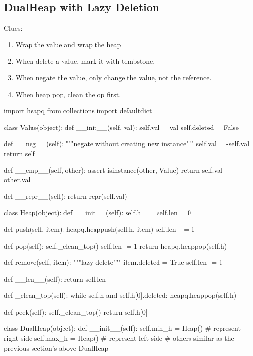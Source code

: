 \subsection{DualHeap with Lazy Deletion}\label{dh_lazy_del}
Clues:
\begin{enumerate}
\item Wrap the value and wrap the heap
\item When delete a value, mark it with tombstone. 
\item When negate the value, only change the value, not the reference. 
\item When heap pop, clean the op first. 
\end{enumerate}
\begin{python}
import heapq
from collections import defaultdict


class Value(object):
    def __init__(self, val):
        self.val = val
        self.deleted = False

    def __neg__(self):
        """negate without creating new instance"""
        self.val = -self.val
        return self

    def __cmp__(self, other):
        assert isinstance(other, Value)
        return self.val - other.val

    def __repr__(self):
        return repr(self.val)


class Heap(object):
    def __init__(self):
        self.h = []
        self.len = 0

    def push(self, item):
        heapq.heappush(self.h, item)
        self.len += 1

    def pop(self):
        self._clean_top()
        self.len -= 1
        return heapq.heappop(self.h)

    def remove(self, item):
        """lazy delete"""
        item.deleted = True
        self.len -= 1

    def __len__(self):
        return self.len

    def _clean_top(self):
        while self.h and self.h[0].deleted:
            heapq.heappop(self.h)

    def peek(self):
        self._clean_top()
        return self.h[0]


class DualHeap(object):
    def __init__(self):
        self.min_h = Heap()  # represent right side
        self.max_h = Heap()  # represent left side
    # others similar as the previous section's above DualHeap
\end{python}
